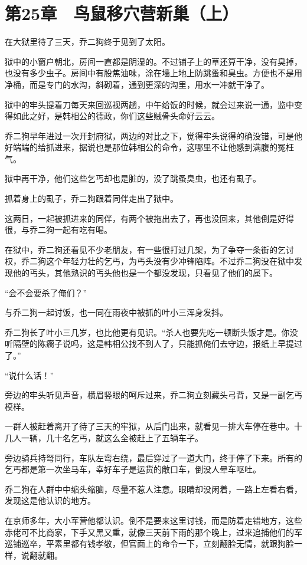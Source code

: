 \section{第25章　鸟鼠移穴营新巢（上）}

在大狱里待了三天，乔二狗终于见到了太阳。

狱中的小窗户朝北，房间一直都是阴湿的。不过铺子上的草还算干净，没有臭掉，也没有多少虫子。房间中有股焦油味，涂在墙上地上防跳蚤和臭虫。方便也不是用净桶，而是专门的水沟，斜砌着，通到更深的沟里，用水一冲就干净了。

狱中的牢头提着刀每天来回巡视两趟，中午给饭的时候，就会过来说一通，监中变得如此之好，是韩相公的德政，你们这些贼骨头命好云云。

乔二狗早年进过一次开封府狱，两边的对比之下，觉得牢头说得的确没错，可是他好端端的给抓进来，据说也是那位韩相公的命令，这哪里不让他感到满腹的冤枉气。

狱中再干净，他们这些乞丐却也是脏的，没了跳蚤臭虫，也还有虱子。

抓着身上的虱子，乔二狗跟着同伴走出了狱中。

这两日，一起被抓进来的同伴，有两个被拖出去了，再也没回来，其他倒是好得很，与乔二狗一起有吃有喝。

在狱中，乔二狗还看见不少老朋友，有一些很打过几架，为了争夺一条街的乞讨权，乔二狗这个年轻力壮的乞丐，为丐头没有少冲锋陷阵。不过乔二狗没在狱中发现他的丐头，其他熟识的丐头他也是一个都没发现，只看见了他们的属下。

“会不会要杀了俺们？”

与乔二狗一起讨饭，也一同在雨夜中被抓的叶小三浑身发抖。

乔二狗长了叶小三几岁，也比他更有见识。“杀人也要先吃一顿断头饭才是。你没听隔壁的陈瘸子说吗，这是韩相公找不到人了，只能抓俺们去守边，报纸上早提过了。”

“说什么话！”

旁边的牢头听见声音，横眉竖眼的呵斥过来，乔二狗立刻藏头弓背，又是一副乞丐模样。

一群人被赶着离开了待了三天的牢狱，从后门出来，就看见一排大车停在巷中。十几人一辆，几十名乞丐，就这么全被赶上了五辆车子。

旁边骑兵持弩同行，车队左弯右绕，最后穿过了一道大门，终于停了下来。所有的乞丐都是第一次坐马车，幸好车子是运货的敞口车，倒没人晕车呕吐。

乔二狗在人群中中缩头缩脑，尽量不惹人注意。眼睛却没闲着，一路上左看右看，发现这是他认识的地方。

在京师多年，大小军营他都认识。倒不是要来这里讨钱，而是防着走错地方，这些赤佬可不比商家，下手又黑又重，就像三天前下雨的那个晚上，过来追捕他们的军巡铺巡卒，平素里都有钱孝敬，但官面上的命令一下，立刻翻脸无情，就跟狗脸一样，说翻就翻。

